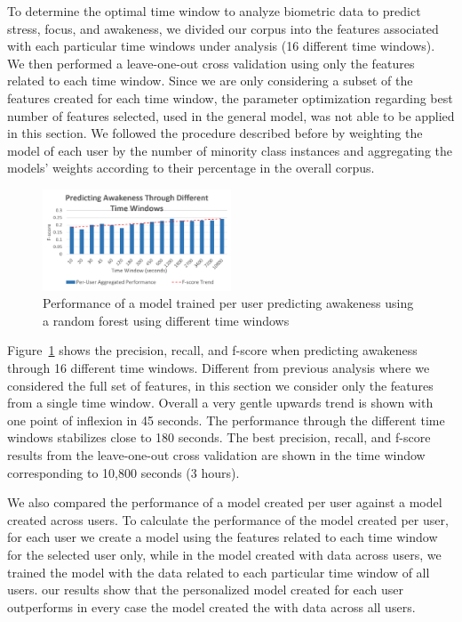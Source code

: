 To determine the optimal time window to analyze biometric
data to predict stress, focus, and awakeness, 
we divided our corpus into the features associated with 
each particular time windows under analysis (16 different
time windows).
We then performed a leave-one-out cross validation
using only the features related to each time window.
Since we are only considering a subset of the features
created for each time window, the 
parameter optimization regarding best number of features 
selected, used in the general model, was
not able to be applied in this section.
We followed the procedure described before by weighting
the model of each user by the number of minority
class instances and aggregating the models' weights
according to their percentage in the overall corpus.

\begin{figure}
  \centering
      \includegraphics[width=0.5\textwidth]{20180912AwakenessTWBars.png}
  \caption{Performance of a model trained per user predicting
  awakeness using a random forest using different time windows
  }
   \label{timeWindowsPandR}
\end{figure}

Figure~\ref{timeWindowsPandR} shows the precision, recall,
and f-score when predicting awakeness through 16 
different time windows. 
Different from previous analysis where we considered the
full set of features, in this section we consider only the 
features from a single time window. Overall a very
gentle upwards trend is shown with one point
of inflexion in 45 seconds. The performance
through the different time windows stabilizes close 
to 180 seconds.
The best precision, recall, and f-score 
results from the
leave-one-out cross validation are shown in 
the time window corresponding to 10,800 seconds
(3 hours). 

We also compared the performance of a model created per user against
a model created across users.
To calculate the performance of the model created per user,
for each user we create a model using the features 
related to each time window for the selected user only, 
while in the model created with data across users,
we trained the model with the data related to each
particular time window of all users.
our results show that the personalized model created
for each user outperforms in every case
the model created the with data across all users.

